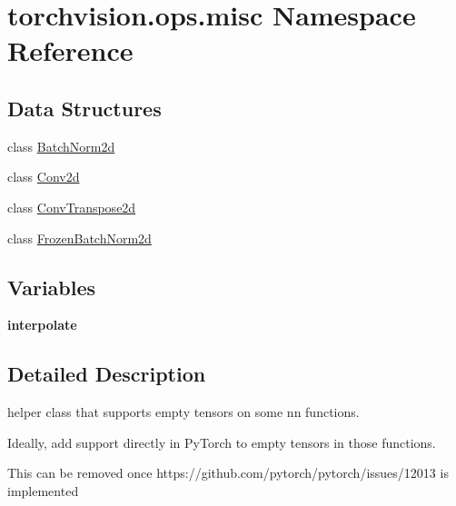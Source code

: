\hypertarget{namespacetorchvision_1_1ops_1_1misc}{}\section{torchvision.\+ops.\+misc Namespace Reference}
\label{namespacetorchvision_1_1ops_1_1misc}
\subsection*{Data Structures}
\begin{DoxyCompactItemize}
\item 
class \hyperlink{classtorchvision_1_1ops_1_1misc_1_1BatchNorm2d}{Batch\+Norm2d}
\item 
class \hyperlink{classtorchvision_1_1ops_1_1misc_1_1Conv2d}{Conv2d}
\item 
class \hyperlink{classtorchvision_1_1ops_1_1misc_1_1ConvTranspose2d}{Conv\+Transpose2d}
\item 
class \hyperlink{classtorchvision_1_1ops_1_1misc_1_1FrozenBatchNorm2d}{Frozen\+Batch\+Norm2d}
\end{DoxyCompactItemize}
\subsection*{Variables}
\begin{DoxyCompactItemize}
\item 
\mbox{\label{namespacetorchvision_1_1ops_1_1misc_a783d7b4547f9432dbd0326558fbd9c09}} 
{\bfseries interpolate}
\end{DoxyCompactItemize}


\subsection{Detailed Description}
\begin{DoxyVerb}helper class that supports empty tensors on some nn functions.

Ideally, add support directly in PyTorch to empty tensors in
those functions.

This can be removed once https://github.com/pytorch/pytorch/issues/12013
is implemented
\end{DoxyVerb}
 